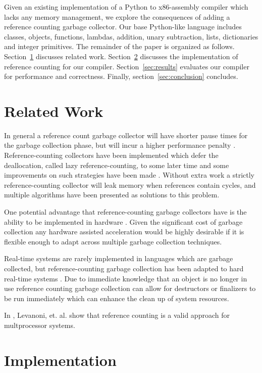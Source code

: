 \documentclass{sigplanconf}
\begin{document}
Given an existing implementation of a Python to x86-assembly compiler which lacks any memory management, we explore the consequences of adding a reference counting garbage collector.  Our base Python-like language includes classes, objects, functions, lambdas, addition, unary subtraction, lists, dictionaries and integer primitives.  The remainder of the paper is organized as follows.  Section~\ref{sec:related} discusses related work.  Section~\ref{sec:implementation} discusses the implementation of reference counting for our compiler.  Section~\ref{sec:results} evaluates our compiler for performance and correctness.  Finally, section~\ref{sec:conclusion} concludes.


\section{Related Work}
\label{sec:related}
In general a reference count garbage collector will have shorter pause times for the garbage collection phase, but will incur a higher performance penalty \cite{joisha}\cite{blackburn}.  Reference-counting collectors have been implemented which defer the deallocation, called lazy reference-counting, to some later time and some improvements on such strategies have been made \cite{boehm}.  Without extra work a strictly reference-counting collector will leak memory when references contain cycles, and multiple algorithms have been presented as solutions to this problem. \cite{lin}\cite{trancon}

One potential advantage that reference-counting garbage collectors have is the ability to be implemented in hardware \cite{joao}.  Given the significant cost of garbage collection \cite{hertz} any hardware assisted acceleration would be highly desirable if it is flexible enough to adapt across multiple garbage collection techniques. 

Real-time systems are rarely implemented in languages which are garbage collected, but reference-counting garbage collection has been adapted to hard real-time systems \cite{ritzaou}.  Due to immediate knowledge that an object is no longer in use reference counting garbage collection can allow for destructors or finalizers to be run immediately which can enhance the clean up of system resources.

In \cite{levanoni}, Levanoni, et. al. show that reference counting is a valid approach for multprocessor systems.

\par
\section{Implementation}
\label{sec:implementation}
\end{document}
